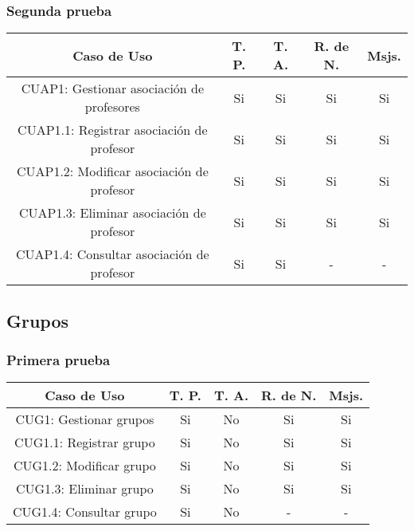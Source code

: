 \subsubsection{Segunda prueba}
\begin{center}
	\begin{tabular}{ |c|c|c|c|c| } 
		\hline
		Caso de Uso & T. P. & T. A. & R. de N. & Msjs. \\
		\hline 
		CUAP1: Gestionar asociación de profesores & Si & Si & Si & Si \\ 
		CUAP1.1: Registrar asociación de profesor & Si & Si & Si & Si \\ 
		CUAP1.2: Modificar asociación de profesor & Si & Si & Si & Si \\ 
		CUAP1.3: Eliminar asociación de profesor & Si & Si & Si & Si \\ 
		CUAP1.4: Consultar asociación de profesor & Si & Si & - & - \\ 
		\hline
	\end{tabular}
\end{center}


\subsection{Grupos}

\subsubsection{Primera prueba}
\begin{center}
	\begin{tabular}{ |c|c|c|c|c| } 
		\hline
		Caso de Uso & T. P. & T. A. & R. de N. & Msjs. \\
		\hline 
		CUG1: Gestionar grupos & Si & No & Si & Si \\ 
		CUG1.1: Registrar grupo & Si & No & Si & Si \\ 
		CUG1.2: Modificar grupo & Si & No & Si & Si \\ 
		CUG1.3: Eliminar grupo & Si & No & Si & Si \\ 
		CUG1.4: Consultar grupo & Si & No & - & - \\ 
		\hline
	\end{tabular}
\end{center}

